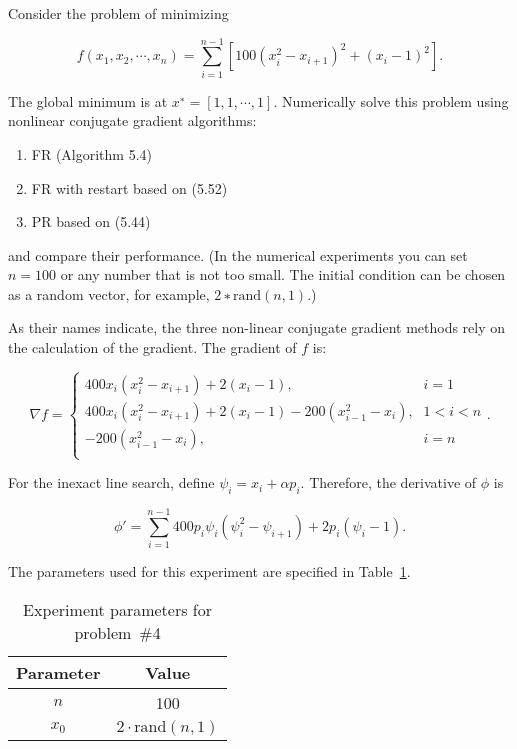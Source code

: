 \begin{problem}
  Consider the problem of minimizing

  \[f(x_{1},x_{2},\cdots,x_{n}) = \sum_{i=1}^{n-1}[100(x^{2}_{i} - x_{i+1})^{2} +(x_{i} - 1)^{2}]\textrm{.}\]

  The global minimum is at $x^{∗} = [1, 1,\cdots,1]$. Numerically solve this problem using nonlinear conjugate gradient algorithms:
  \begin{enumerate}
    \item FR (Algorithm 5.4)
    \item FR with restart based on (5.52)
    \item PR based on (5.44)
  \end{enumerate}

  \noindent
  and compare their performance. (In the numerical experiments you can set ${n = 100}$ or any number that is not too small. The initial condition can be chosen as a random vector, for example, $2∗\text{rand}(n,1)$.)
\end{problem}

As their names indicate, the three non-linear conjugate gradient methods rely on the calculation of the gradient.  The gradient of $f$ is:

\[ \nabla f = \left\{
                \begin{array}{lc}
                  400x_i(x_{i}^{2} - x_{i+1}) + 2(x_i - 1)\text{,} & i = 1 \\
                  400x_i(x_{i}^{2} - x_{i+1}) + 2(x_i - 1) -200(x^{2}_{i-1} - x_{i})\text{,} & 1 < i < n \\
                  -200(x^{2}_{i-1} - x_{i})\text{,} & i = n \\
                \end{array}
              \right. \text{.} \]
              
\noindent
For the inexact line search, define $\psi_i = x_i + \alpha p_i$.  Therefore, the derivative of $\phi$ is

\[ \phi' =  \sum_{i=1}^{n-1} 400 p_i \psi_i (\psi_{i}^{2} - \psi_{i+1}) 
            + 2p_i(\psi_i - 1) \text{.} \]

\noindent
The parameters used for this experiment are specified in Table~\ref{tab:p04:ExperimentParams}.

\begin{table}[h]
  \centering
  \begin{tabular}{|c|c|}
    \hline
    \textbf{Parameter} & \textbf{Value} \\
    \hline\hline
    $n$     & 100 \\\hline
    $x_{0}$ & $2\cdot\text{rand}(n,1)$\\\hline
  \end{tabular}
  \caption{Experiment parameters for problem~\#4}\label{tab:p04:ExperimentParams}
\end{table}

